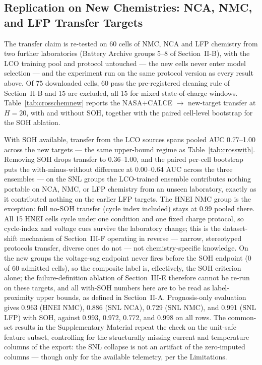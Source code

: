 \documentclass[11pt,a4paper]{article}
\begin{document}
\subsection{Replication on New Chemistries: NCA, NMC, and LFP Transfer Targets}
The transfer claim is re-tested on 60 cells of NMC, NCA and LFP chemistry from two further laboratories (Battery Archive groups 5--8 of Section~II-B), with the LCO training pool and protocol untouched --- the new cells never enter model selection --- and the experiment run on the same protocol version as every result above. Of 75 downloaded cells, 60 pass the pre-registered cleaning rule of Section~II-B and 15 are excluded, all 15 for mixed state-of-charge windows. Table~\ref{tab:crosschemnew} reports the NASA+CALCE $\rightarrow$ new-target transfer at $H{=}20$, with and without SOH, together with the paired cell-level bootstrap for the SOH ablation.

With SOH available, transfer from the LCO sources spans pooled AUC 0.77--1.00 across the new targets --- the same upper-bound regime as Table~\ref{tab:crosswith}. Removing SOH drops transfer to 0.36--1.00, and the paired per-cell bootstrap puts the with-minus-without difference at 0.00--0.64 AUC across the three ensembles --- on the SNL groups the LCO-trained ensemble contributes nothing portable on NCA, NMC, or LFP chemistry from an unseen laboratory, exactly as it contributed nothing on the earlier LFP targets. The HNEI NMC group is the exception: full no-SOH transfer (cycle index included) stays at 0.99 pooled there. All 15 HNEI cells cycle under one condition and one fixed charge protocol, so cycle-index and voltage cues survive the laboratory change; this is the dataset-shift mechanism of Section~III-F operating in reverse --- narrow, stereotyped protocols transfer, diverse ones do not --- not chemistry-specific knowledge. On the new groups the voltage-sag endpoint never fires before the SOH endpoint (0 of 60 admitted cells), so the composite label is, effectively, the SOH criterion alone; the failure-definition ablation of Section~III-E therefore cannot be re-run on these targets, and all with-SOH numbers here are to be read as label-proximity upper bounds, as defined in Section~II-A. Prognosis-only evaluation gives 0.963 (HNEI NMC), 0.886 (SNL NCA), 0.729 (SNL NMC), and 0.991 (SNL LFP) with SOH, against 0.993, 0.972, 0.772, and 0.998 on all rows. The common-set results in the Supplementary Material repeat the check on the unit-safe feature subset, controlling for the structurally missing current and temperature columns of the export: the SNL collapse is not an artifact of the zero-imputed columns --- though only for the available telemetry, per the Limitations.
\end{document}
